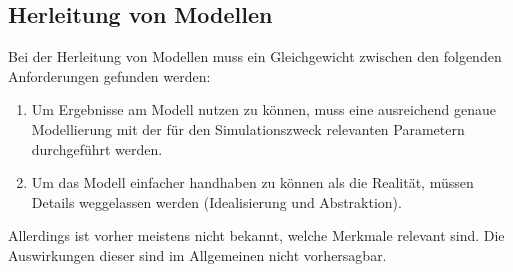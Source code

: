 		\subsection{Herleitung von Modellen} %
			Bei der Herleitung von Modellen muss ein Gleichgewicht zwischen den folgenden Anforderungen gefunden werden:
			\begin{enumerate}
				\item Um Ergebnisse am Modell nutzen zu können, muss eine ausreichend genaue Modellierung mit der für den Simulationszweck relevanten Parametern durchgeführt werden.
				\item Um das Modell einfacher handhaben zu können als die Realität, müssen Details weggelassen werden (Idealisierung und Abstraktion).
			\end{enumerate}
			Allerdings ist vorher meistens nicht bekannt, welche Merkmale relevant sind. Die Auswirkungen dieser sind im Allgemeinen nicht vorhersagbar.

